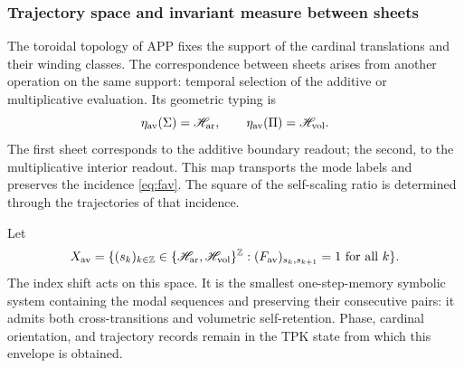 \subsubsection{Trajectory space and invariant measure between sheets}
\label{sec:medida-retorno-hojas}

The toroidal topology of APP fixes the support of the cardinal translations
and their winding classes. The correspondence between sheets arises from
another operation on the same support: temporal selection of the
additive or multiplicative evaluation. Its geometric typing is
\[
 \eta_{\rm av}(\Sigma)=\mathscr H_{\rm ar},\qquad
 \eta_{\rm av}(\Pi)=\mathscr H_{\rm vol}.
\]
The first sheet corresponds to the additive boundary readout; the second,
to the multiplicative interior readout. This map transports the mode
labels and preserves the incidence \eqref{eq:fav}. The square of the
self-scaling ratio is determined through the trajectories of that incidence.

\begin{definition}
Let
\[
 X_{\rm av}=\{(s_k)_{k\in\mathbb Z}\in
 \{\mathscr H_{\rm ar},\mathscr H_{\rm vol}\}^{\mathbb Z}:
 (F_{\rm av})_{s_k,s_{k+1}}=1\text{ for all }k\}.
\]
The index shift acts on this space. It is the smallest one-step-memory
symbolic system containing the modal sequences and preserving
their consecutive pairs: it admits both cross-transitions and
volumetric self-retention. Phase, cardinal orientation, and trajectory
records remain in the TPK state from which this
envelope is obtained.
\end{definition}

